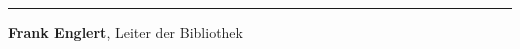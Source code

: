 \begin{center}\rule{0.5\linewidth}{\linethickness}\end{center}

\textbf{Frank Englert}, Leiter der Bibliothek
